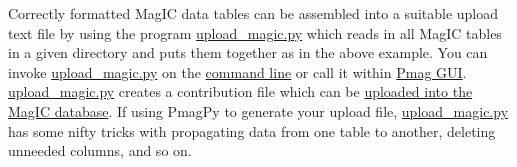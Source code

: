 \documentclass[11pt]{book}
\begin{document}
{{{Correctly formatted MagIC data tables can be assembled into a suitable upload text file by using the program \href{#upload_magic.py}{upload\_magic.py} which reads in all MagIC tables in a given directory and puts them together as in the above example.  You can invoke \href{#upload_magic.py}{upload\_magic.py} on the \href{#command_line}{command line} or call it within  \href{#pmag_gui.py}{Pmag GUI}.     \href{#upload_magic.py}{upload\_magic.py} creates a contribution file which can be \href{#magic_upload}{uploaded into the MagIC database}.  If using PmagPy to generate your upload file, \href{#upload_magic.py}{upload\_magic.py} has some nifty tricks with propagating data from one table to another, deleting unneeded columns, and so on.



%
%
%
%
%
%
%
%
%
%
%
%
%
%
%
%
%
%






}}}
\end{document}
